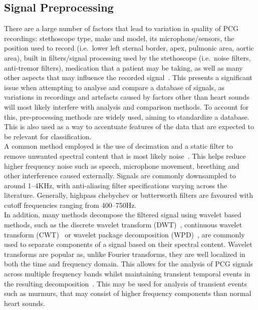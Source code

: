 \documentclass[titlepage, 12pt]{scrartcl} \usepackage{enumitem}
\begin{document}
\subsection{Signal Preprocessing}
There are a large number of factors that lead to variation in quality of PCG
recordings: stethoscope type, make and model, its microphone/sensors, the
position used to record (i.e.\ lower left sternal border, apex, pulmonic area,
aortic area), built in filters/signal processing used by the stethoscope (i.e.\
noise filters, anti-tremor filters), medication that a patient may be taking,
as well as many other aspects that may influence the recorded
signal~\parencite[p.4]{Pavlopoulos2004}. This presents a significant issue when
attempting to analyse and compare a database of signals, as variations in
recordings and artefacts caused by factors other than heart sounds will most
likely interfere with analysis and comparison methods. To account for this,
pre-processing methods are widely used, aiming to standardize a database. This
is also used as a way to accentuate features of the data that are expected to
be relevant for classification.\\

A common method employed is the use of decimation and a static filter to remove
unwanted spectral content that is most likely noise~\parencite{Liang1997a,
Homsi2016, Springer2016, Gupta2007}. This helps reduce higher frequency noise
such as speech, microphone movement, breething and other interference caused
externally. Signals are commonly downsampled to around 1--4KHz, with
anti-aliasing filter specifications varying across the literature. Generally,
highpass chebychev or butterworth filters are favoured with cutoff frequencies
ranging from 400--750Hz.\\

In addition, many methods decompose the filtered signal using wavelet based
methods, such as the discrete wavelet transform (DWT)~\parencite{Liang1997a,
Pavlopoulos2004}, continuous wavelet transform (CWT)~\parencite{Langley2016} or
wavelet package decomposition (WPD)~\parencite{Liang1998}, are commonly used to
separate components of a signal based on their spectral content.
Wavelet transforms are popular as, unlike Fourier transforms, they are well
localized in both the time and frequency domain. This allows for the analysis
of PCG signals across multiple frequency bands whilst maintaining transient
temporal events in the resulting decomposition~\parencite[p.93]{Ari2008}.
This may be used for analysis of transient events such as murmurs, that may
consist of higher frequency components than normal heart sounds.
\end{document}

